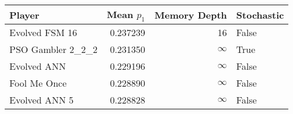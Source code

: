 \begin{tabular}{lrrl}
\toprule
            Player &  Mean $p_1$ &  Memory Depth & Stochastic \\
\midrule
    Evolved FSM 16 &    0.237239 &            16 &      False \\
 PSO Gambler 2\_2\_2 &    0.231350 &            \(\infty\) &       True \\
       Evolved ANN &    0.229196 &            \(\infty\) &      False \\
      Fool Me Once &    0.228890 &            \(\infty\) &      False \\
     Evolved ANN 5 &    0.228828 &            \(\infty\) &      False \\
\bottomrule
\end{tabular}
